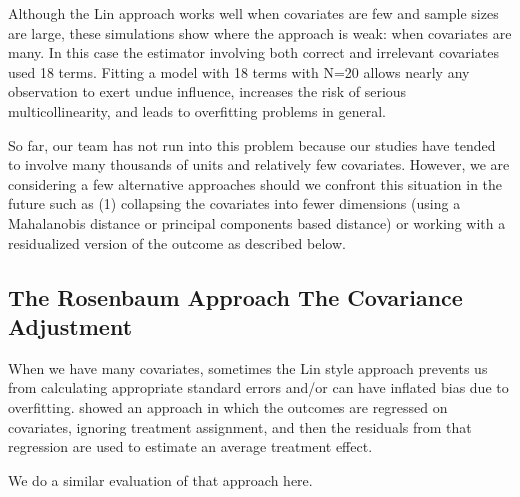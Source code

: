 \documentclass[
  12pt,
]{book}
\theoremstyle{definition}
\theoremstyle{definition}
\theoremstyle{definition}
\theoremstyle{remark}
\begin{document}
Although the Lin approach works well when covariates are few and sample
sizes are large, these simulations show where the approach is weak: when
covariates are many. In this case the estimator involving both correct
and irrelevant covariates used 18 terms. Fitting a model with 18 terms
with N=20 allows nearly any observation to exert undue influence,
increases the risk of serious multicollinearity, and leads to
overfitting problems in general.

So far, our team has not run into this problem because our studies have
tended to involve many thousands of units and relatively few covariates.
However, we are considering a few alternative approaches should we
confront this situation in the future such as (1) collapsing the
covariates into fewer dimensions (using a Mahalanobis distance or
principal components based distance) or working with a residualized
version of the outcome as described below.

\hypertarget{the-rosenbaum-approach-the-covariance-adjustment}{%
\subsection{The Rosenbaum Approach The Covariance
Adjustment}\label{the-rosenbaum-approach-the-covariance-adjustment}}

When we have many covariates, sometimes the Lin style approach prevents
us from calculating appropriate standard errors and/or can have inflated
bias due to overfitting. \citet{rosenbaum:2002a} showed an approach in
which the outcomes are regressed on covariates, ignoring treatment
assignment, and then the residuals from that regression are used to
estimate an average treatment effect.

We do a similar evaluation of that approach here.
\end{document}
